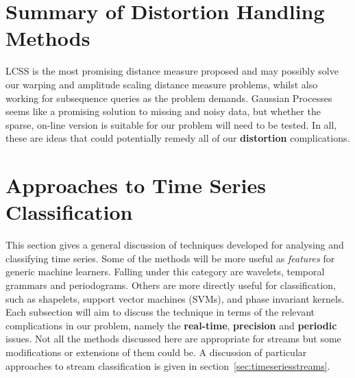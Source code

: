 	\section{Summary of Distortion Handling Methods}
	LCSS is the most promising distance measure proposed and may possibly solve our warping and amplitude scaling distance measure problems, whilst also working for subsequence queries as the problem demands. Gaussian Processes seems like a promising solution to missing and noisy data, but whether the sparse, on-line version is suitable for our problem will need to be tested. In all, these are ideas that could potentially remedy all of our \textbf{distortion} complications.
	
	\section{Approaches to Time Series Classification}
	This section gives a general discussion of techniques developed for analysing and classifying time series. Some of the methods will be more useful as \emph{features} for generic machine learners. Falling under this category are wavelets, temporal grammars and periodograms. Others are more directly useful for classification, such as shapelets, support vector machines (SVMs), and phase invariant kernels. Each subsection will aim to discuss the technique in terms of the relevant complications in our problem, namely the \textbf{real-time}, \textbf{precision} and \textbf{periodic} issues. Not all the methods discussed here are appropriate for streams but some modifications or extensions of them could be. A discussion of particular approaches to stream classification is given in section~\ref{sec:timeseriesstreams}.
	

	
